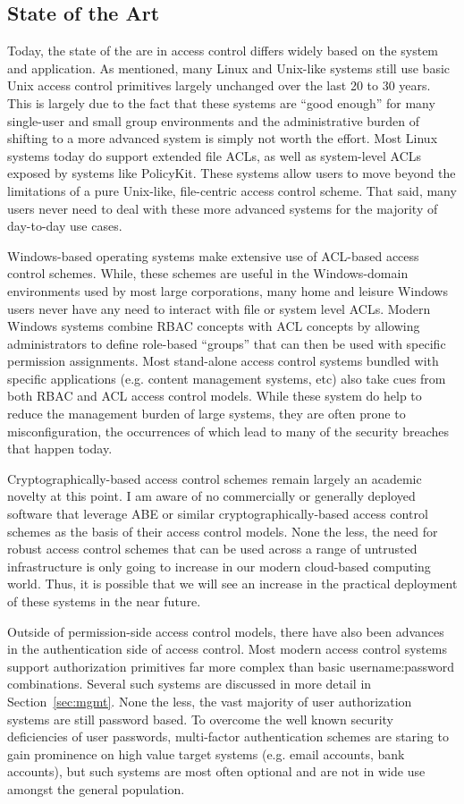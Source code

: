 \documentclass{sig-alternate}
\begin{document}
\subsection{State of the Art}

Today, the state of the are in access control differs widely based on
the system and application. As mentioned, many Linux and Unix-like
systems still use basic Unix access control primitives largely
unchanged over the last 20 to 30 years. This is largely due to the
fact that these systems are ``good enough'' for many single-user and
small group environments and the administrative burden of shifting to
a more advanced system is simply not worth the effort. Most Linux
systems today do support extended file ACLs, as well as system-level
ACLs exposed by systems like PolicyKit. These systems allow users to
move beyond the limitations of a pure Unix-like, file-centric access
control scheme. That said, many users never need to deal with these
more advanced systems for the majority of day-to-day use cases.

Windows-based operating systems make extensive use of ACL-based access
control schemes. While, these schemes are useful in the Windows-domain
environments used by most large corporations, many home and leisure
Windows users never have any need to interact with file or system
level ACLs. Modern Windows systems combine RBAC concepts with ACL
concepts by allowing administrators to define role-based ``groups''
that can then be used with specific permission assignments. Most
stand-alone access control systems bundled with specific applications
(e.g. content management systems, etc) also take cues from both RBAC
and ACL access control models. While these system do help to reduce
the management burden of large systems, they are often prone to
misconfiguration, the occurrences of which lead to many of the
security breaches that happen today.

Cryptographically-based access control schemes remain largely an
academic novelty at this point. I am aware of no commercially or
generally deployed software that leverage ABE or similar
cryptographically-based access control schemes as the basis of their
access control models. None the less, the need for robust access
control schemes that can be used across a range of untrusted
infrastructure is only going to increase in our modern cloud-based
computing world. Thus, it is possible that we will see an increase in
the practical deployment of these systems in the near future.

Outside of permission-side access control models, there have also been
advances in the authentication side of access control. Most modern
access control systems support authorization primitives far more
complex than basic username:password combinations. Several such
systems are discussed in more detail in Section~\ref{sec:mgmt}. None
the less, the vast majority of user authorization systems are still
password based. To overcome the well known security deficiencies of
user passwords, multi-factor authentication schemes are staring to
gain prominence on high value target systems (e.g. email accounts,
bank accounts), but such systems are most often optional and are not
in wide use amongst the general population.
\end{document}
